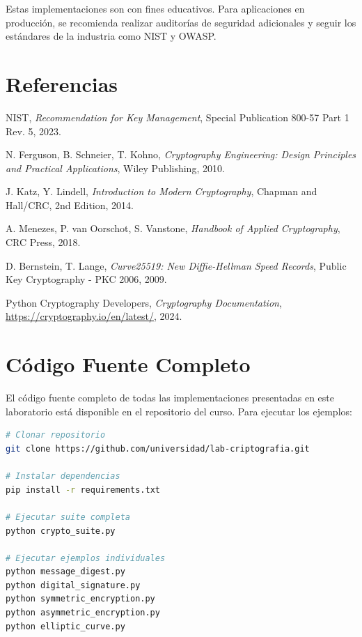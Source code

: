 \documentclass[12pt,a4paper]{article}
\begin{document}
\begin{securityalert}
	Estas implementaciones son con fines educativos. Para aplicaciones en producción, se recomienda realizar auditorías de seguridad adicionales y seguir los estándares de la industria como NIST y OWASP.
\end{securityalert}

\section{Referencias}

\begin{thebibliography}{9}

	NIST,
	\textit{Recommendation for Key Management},
	Special Publication 800-57 Part 1 Rev. 5,
	2023.

	N. Ferguson, B. Schneier, T. Kohno,
	\textit{Cryptography Engineering: Design Principles and Practical Applications},
	Wiley Publishing,
	2010.

	J. Katz, Y. Lindell,
	\textit{Introduction to Modern Cryptography},
	Chapman and Hall/CRC,
	2nd Edition, 2014.

	A. Menezes, P. van Oorschot, S. Vanstone,
	\textit{Handbook of Applied Cryptography},
	CRC Press,
	2018.

	D. Bernstein, T. Lange,
	\textit{Curve25519: New Diffie-Hellman Speed Records},
	Public Key Cryptography - PKC 2006,
	2009.

	Python Cryptography Developers,
	\textit{Cryptography Documentation},
	\url{https://cryptography.io/en/latest/},
	2024.

\end{thebibliography}

\appendix

\section{Código Fuente Completo}

El código fuente completo de todas las implementaciones presentadas en este
laboratorio está disponible en el repositorio del curso. Para ejecutar los
ejemplos:

\begin{lstlisting}[language=bash, caption=Instalación y ejecución]
# Clonar repositorio
git clone https://github.com/universidad/lab-criptografia.git

# Instalar dependencias
pip install -r requirements.txt

# Ejecutar suite completa
python crypto_suite.py

# Ejecutar ejemplos individuales
python message_digest.py
python digital_signature.py
python symmetric_encryption.py
python asymmetric_encryption.py
python elliptic_curve.py
\end{lstlisting}
\end{document}
